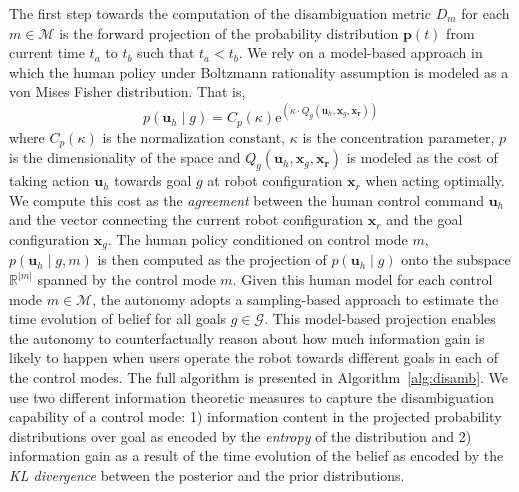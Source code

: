 \documentclass[conference]{IEEEtran}
\begin{document}
The first step towards the computation of the disambiguation metric $D_m$ for each $m \in \mathcal{M}$ is the forward projection of the probability distribution $\boldsymbol{p}(t)$ from current time $t_a$ to $t_b$ such that $t_a < t_b$. We rely on a model-based approach in which the human policy under Boltzmann rationality assumption is modeled as a von Mises Fisher distribution. That is,  
\begin{equation}
	p(\boldsymbol{u}_h \;| \;g ) = C_p(\kappa)\text{e}^{(\kappa\cdot Q_g(\boldsymbol{u}_h, \boldsymbol{x}_g, \boldsymbol{x_r}))}
\end{equation}
where $C_p(\kappa)$ is the normalization constant, $\kappa$ is the concentration parameter, $p$ is the dimensionality of the space and $Q_g(\boldsymbol{u}_h, \boldsymbol{x}_g, \boldsymbol{x_r})$ is modeled as the cost of taking action $\boldsymbol{u}_h$ towards goal $g$ at robot configuration $\boldsymbol{x}_r$ when acting optimally. We compute this cost as the \textit{agreement} between the human control command $\boldsymbol{u}_h$ and the vector connecting the current robot configuration $\boldsymbol{x}_r$ and the goal configuration $\boldsymbol{x}_g$. The human policy conditioned on control mode $m$, $p(\boldsymbol{u}_h \;| \;g, m )$ is then computed as the projection of $p(\boldsymbol{u}_h \;| \;g )$ onto the subspace $\mathbb{R}^{|m|}$ spanned by the control mode $m$. Given this human model for each control mode $m \in \mathcal{M}$, the autonomy adopts a sampling-based approach to estimate the time evolution of belief for all goals $g \in \mathcal{G}$. This model-based projection enables the autonomy to counterfactually reason about how much information gain is likely to happen when users operate the robot towards different goals in each of the control modes. The full algorithm is presented in Algorithm~\ref{alg:disamb}. We use two different information theoretic measures to capture the disambiguation capability of a control mode: 1) information content in the projected probability distributions over goal as encoded by the \textit{entropy} of the distribution and 2) information gain as a result of the time evolution of the belief as encoded by the \textit{KL divergence} between the posterior and the prior distributions. 
\end{document}
